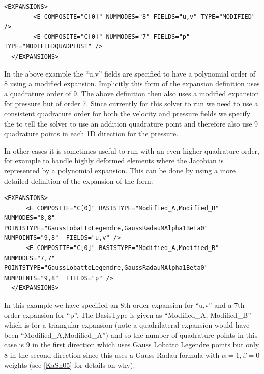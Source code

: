 \begin{lstlisting}[style=XMLStyle]
  <EXPANSIONS>
        <E COMPOSITE="C[0]" NUMMODES="8" FIELDS="u,v" TYPE="MODIFIED" />
        <E COMPOSITE="C[0]" NUMMODES="7" FIELDS="p"   TYPE="MODIFIEDQUADPLUS1" />
  </EXPANSIONS>
\end{lstlisting}

In the above example the ``u,v'' fields are specified to have a
polynomial order of 8 using a modified expansion. Implicitly this form
of the expansion definition uses a quadrature order of 9. The above
definition then also uses a modified expansion for pressure but of
order 7. Since currently for this solver to run we need to use a
consistent quadrature order for both the velocity and pressure fields
we specify the  to tell the solver to use an
addition quadrature point and therefore also use 9 quadrature points in
each 1D direction for the pressure.

In other cases it is sometimes useful to run with an even higher
quadrature order, for example to handle highly deformed elements where
the Jacobian is represented by a polynomial expansion. This can be done
by using a more detailed definition of the expansion of the form:


\begin{lstlisting}[style=XMLStyle]
  <EXPANSIONS>
      <E COMPOSITE="C[0]" BASISTYPE="Modified_A,Modified_B" NUMMODES="8,8" POINTSTYPE="GaussLobattoLegendre,GaussRadauMAlpha1Beta0" NUMPOINTS="9,8"  FIELDS="u,v" />
      <E COMPOSITE="C[0]" BASISTYPE="Modified_A,Modified_B" NUMMODES="7,7" POINTSTYPE="GaussLobattoLegendre,GaussRadauMAlpha1Beta0" NUMPOINTS="9,8"  FIELDS="p" />
  </EXPANSIONS>
\end{lstlisting}

In this example we have specified an 8th order expansion for ``u,v''
and a 7th order expansion for ``p''. The BasisType is given as
``Modified\_A, Modified\_B'' which is for a triangular expansion (note
a quadrilateral expansion would have been ``Modified\_A,Modified\_A'')
and so the number of quadrature points in this case is 9 in the first
direction which uses Gauss Lobatto Legendre points but only 8 in the
second direction since this uses a Gauss Radau formula with
$\alpha=1,\beta=0$ weights (see \ref{KaSh05} for details on why).
        
